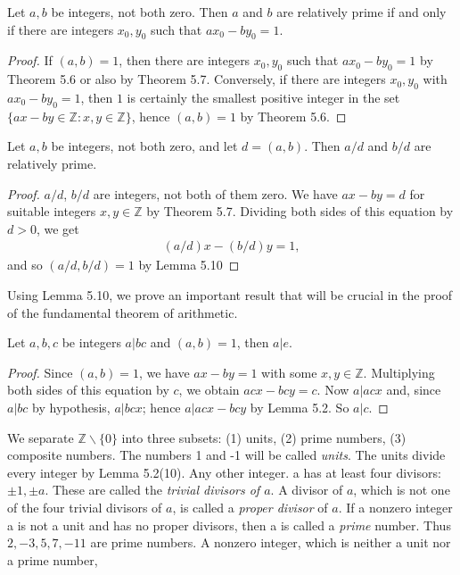 \documentclass[11pt]{amsbook}
\begin{document}


	
\begin{lem}
Let $a, b$ be integers, not both zero. Then $a$ and $b$ are relatively prime if and only if there are integers $x_{0},y_{0}$ such that $ax_{0} - by_{0} = 1$.
	
	\begin{proof}
		If $(a,b) = 1$, then there are integers $x_{0}, y_{0}$ such that $ax_{0}-by_{0} = 1$ by Theorem 5.6 or also by Theorem 5.7. Conversely, if there are integers
$x_{0}, y_{0}$ with $ax_{0}-by_{0} = 1$, then $1$ is certainly the smallest positive integer in the set $\{ax - by \in \mathbb{Z}: x,y \in \mathbb{Z}\}$, hence $(a,b) = 1$ by Theorem 5.6.
	\end{proof}
\end{lem}

\begin{lem}
Let $a, b$ be integers, not both zero, and let $d = (a,b)$. Then $a/d$ and $b/d$ are relatively prime.
	
	\begin{proof}
		$a/d$, $b/d$ are integers, not both of them zero. We have $ax - by = d$ for suitable integers $x,y \in \mathbb{Z}$ by Theorem 5.7. Dividing both sides of this
equation by $d > 0$, we get
		\begin{align*}
			(a/d)x - (b/d)y = 1,
		\end{align*}
		and so $(a/d, b/d) = 1$ by Lemma 5.10
	\end{proof}
\end{lem}

Using Lemma 5.10, we prove an important result that will be crucial in the proof of the fundamental theorem of arithmetic.

\begin{thm}
Let $a, b,c$ be integers $a\vert bc$ and $(a,b) = 1$, then $a\vert e$.
	
	\begin{proof}
		Since $(a,b) = 1$, we have $ax - by = 1$ with some $x,y \in \mathbb{Z}$. Multiplying both sides of this equation by $c$, we obtain $acx - bcy = c$. Now $a\vert acx$ and, since $a\vert bc$ by hypothesis, $a\vert bcx$; hence $a\vert acx - bcy$ by Lemma 5.2. So $a\vert c$.
	\end{proof}
\end{thm}

We separate $\mathbb{Z} \backslash \{0\}$ into three subsets: (1) units, (2) prime numbers, (3) composite numbers. The numbers 1 and -1 will be called \textit{units}. The units
divide every integer by Lemma 5.2(10). Any other integer. a has at least four divisors: $\pm 1, \pm a$. These are called the \textit{trivial divisors of $a$}. A divisor of $a$, which is not one of the four trivial divisors of $a$, is called a \textit{proper divisor} of $a$. If a nonzero integer a is not a unit and has no proper divisors, then a is called a \textit{prime} number. Thus $2, -3, 5, 7, -11$ are prime numbers. A nonzero integer, which is neither a unit nor a prime number,
\end{document}
